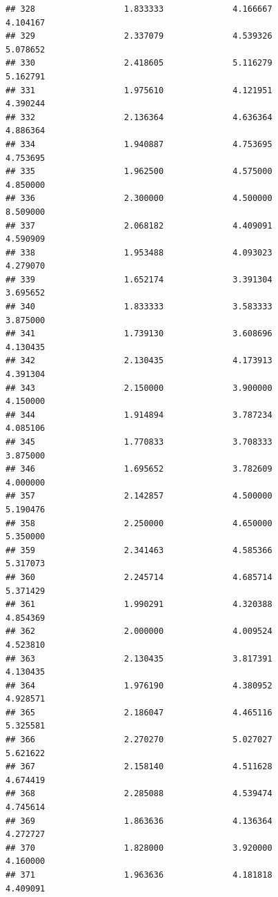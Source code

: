 \documentclass[]{article}
\begin{document}
\begin{verbatim}
## 328                  1.833333              4.166667                4.104167
## 329                  2.337079              4.539326                5.078652
## 330                  2.418605              5.116279                5.162791
## 331                  1.975610              4.121951                4.390244
## 332                  2.136364              4.636364                4.886364
## 334                  1.940887              4.753695                4.753695
## 335                  1.962500              4.575000                4.850000
## 336                  2.300000              4.500000                8.509000
## 337                  2.068182              4.409091                4.590909
## 338                  1.953488              4.093023                4.279070
## 339                  1.652174              3.391304                3.695652
## 340                  1.833333              3.583333                3.875000
## 341                  1.739130              3.608696                4.130435
## 342                  2.130435              4.173913                4.391304
## 343                  2.150000              3.900000                4.150000
## 344                  1.914894              3.787234                4.085106
## 345                  1.770833              3.708333                3.875000
## 346                  1.695652              3.782609                4.000000
## 357                  2.142857              4.500000                5.190476
## 358                  2.250000              4.650000                5.350000
## 359                  2.341463              4.585366                5.317073
## 360                  2.245714              4.685714                5.371429
## 361                  1.990291              4.320388                4.854369
## 362                  2.000000              4.009524                4.523810
## 363                  2.130435              3.817391                4.130435
## 364                  1.976190              4.380952                4.928571
## 365                  2.186047              4.465116                5.325581
## 366                  2.270270              5.027027                5.621622
## 367                  2.158140              4.511628                4.674419
## 368                  2.285088              4.539474                4.745614
## 369                  1.863636              4.136364                4.272727
## 370                  1.828000              3.920000                4.160000
## 371                  1.963636              4.181818                4.409091

\end{verbatim}
\end{document}
